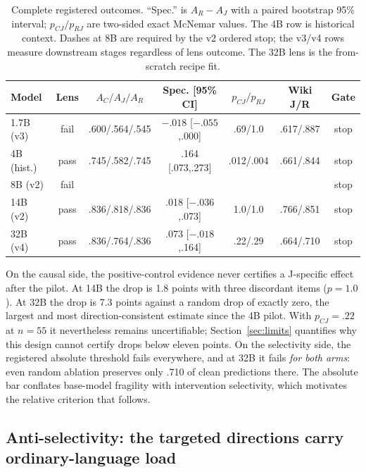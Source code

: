 \documentclass{article}
\newcommand{\na}{\text{n/a}}
\begin{document}
\begin{table}[t]
  \caption{Complete registered outcomes. ``Spec.'' is $A_R-A_J$ with a paired bootstrap
  95\% interval; $p_{CJ}/p_{RJ}$ are two-sided exact McNemar values. The 4B row is
  historical context. Dashes at 8B are required by the v2 ordered stop; the v3/v4 rows
  measure downstream stages regardless of lens outcome. The 32B lens is the
  from-scratch recipe fit.}
  \label{tab:results}
  \centering
  \small
  \begin{tabular}{lcccccc}
    \toprule
    Model & Lens & $A_C/A_J/A_R$ & Spec. [95\% CI] & $p_{CJ}/p_{RJ}$ & Wiki J/R & Gate \\
    \midrule
    1.7B (v3)  & fail & .600/.564/.545 & $-.018$ [$-.055$,.000] & .69/1.0 & .617/.887 & stop \\
    4B (hist.) & pass & .745/.582/.745 & .164 [.073,.273] & .012/.004 & .661/.844 & stop \\
    8B (v2)  & fail & \na & \na & \na & \na & stop \\
    14B (v2) & pass & .836/.818/.836 & .018 [$-.036$,.073] & 1.0/1.0 & .766/.851 & stop \\
    32B (v4) & pass & .836/.764/.836 & .073 [$-.018$,.164] & .22/.29 & .664/.710 & stop \\
    \bottomrule
  \end{tabular}
\end{table}

On the causal side, the positive-control evidence never certifies a J-specific effect
after the pilot. At 14B the drop is 1.8 points with three discordant items ($p=1.0$). At
32B the drop is 7.3 points against a random drop of exactly zero, the largest and most
direction-consistent estimate since the 4B pilot. With $p_{CJ}=.22$ at $n=55$ it
nevertheless remains uncertifiable; Section~\ref{sec:limits} quantifies why this design cannot certify
drops below eleven points. On the selectivity side, the registered absolute threshold
fails everywhere, and at 32B it fails \emph{for both arms}: even random ablation preserves
only .710 of clean predictions there. The absolute bar conflates base-model fragility with
intervention selectivity, which motivates the relative criterion that follows.

\subsection{Anti-selectivity: the targeted directions carry ordinary-language load}
\label{sec:anti}
\end{document}
